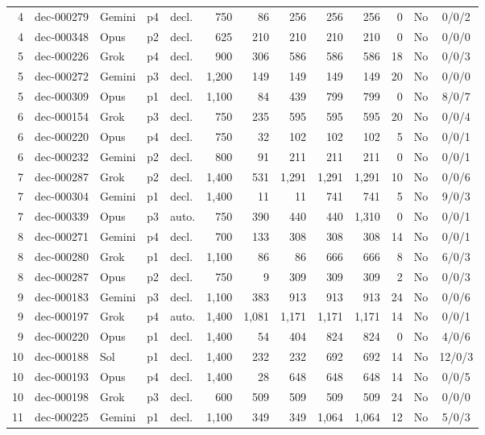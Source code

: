 {\begin{longtable}{@{}rllllrrrrrrcc@{}}
4 & dec-000279 & Gemini & p4 & decl. & 750 & 86 & 256 & 256 & 256 & 0 & No & 0/0/2 \\
4 & dec-000348 & Opus & p2 & decl. & 625 & 210 & 210 & 210 & 210 & 0 & No & 0/0/0 \\
5 & dec-000226 & Grok & p4 & decl. & 900 & 306 & 586 & 586 & 586 & 18 & No & 0/0/3 \\
5 & dec-000272 & Gemini & p3 & decl. & 1,200 & 149 & 149 & 149 & 149 & 20 & No & 0/0/0 \\
5 & dec-000309 & Opus & p1 & decl. & 1,100 & 84 & 439 & 799 & 799 & 0 & No & 8/0/7 \\
6 & dec-000154 & Grok & p3 & decl. & 750 & 235 & 595 & 595 & 595 & 20 & No & 0/0/4 \\
6 & dec-000220 & Opus & p4 & decl. & 750 & 32 & 102 & 102 & 102 & 5 & No & 0/0/1 \\
6 & dec-000232 & Gemini & p2 & decl. & 800 & 91 & 211 & 211 & 211 & 0 & No & 0/0/1 \\
7 & dec-000287 & Grok & p2 & decl. & 1,400 & 531 & 1,291 & 1,291 & 1,291 & 10 & No & 0/0/6 \\
7 & dec-000304 & Gemini & p1 & decl. & 1,400 & 11 & 11 & 741 & 741 & 5 & No & 9/0/3 \\
7 & dec-000339 & Opus & p3 & auto. & 750 & 390 & 440 & 440 & 1,310 & 0 & No & 0/0/1 \\
8 & dec-000271 & Gemini & p4 & decl. & 700 & 133 & 308 & 308 & 308 & 14 & No & 0/0/1 \\
8 & dec-000280 & Grok & p1 & decl. & 1,100 & 86 & 86 & 666 & 666 & 8 & No & 6/0/3 \\
8 & dec-000287 & Opus & p2 & decl. & 750 & 9 & 309 & 309 & 309 & 2 & No & 0/0/3 \\
9 & dec-000183 & Gemini & p3 & decl. & 1,100 & 383 & 913 & 913 & 913 & 24 & No & 0/0/6 \\
9 & dec-000197 & Grok & p4 & auto. & 1,400 & 1,081 & 1,171 & 1,171 & 1,171 & 14 & No & 0/0/1 \\
9 & dec-000220 & Opus & p1 & decl. & 1,400 & 54 & 404 & 824 & 824 & 0 & No & 4/0/6 \\
10 & dec-000188 & Sol & p1 & decl. & 1,400 & 232 & 232 & 692 & 692 & 14 & No & 12/0/3 \\
10 & dec-000193 & Opus & p4 & decl. & 1,400 & 28 & 648 & 648 & 648 & 14 & No & 0/0/5 \\
10 & dec-000198 & Grok & p3 & decl. & 600 & 509 & 509 & 509 & 509 & 24 & No & 0/0/0 \\
11 & dec-000225 & Gemini & p1 & decl. & 1,100 & 349 & 349 & 1,064 & 1,064 & 12 & No & 5/0/3 \\

\end{longtable}}

